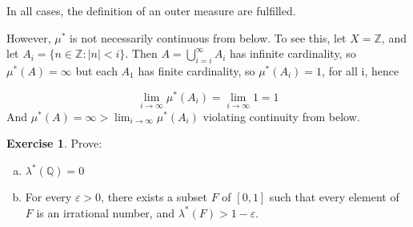 \documentclass[11pt,oneside]{article}
\numberwithin{equation}{section}
\theoremstyle{definition}
\newtheorem{exercise}{Exercise}
\def\QQ{\mathbb{Q}}
\def\ZZ{\mathbb{Z}}
\begin{document}
\begin{solution}
\begin{enumerate}[(a)]
      In all cases, the definition of an outer measure are fulfilled.
  \end{enumerate}

  However, $\mu ^*$ is not necessarily continuous from below.  To see
  this, let $X = \ZZ$, and let $A_i = \{ n \in \ZZ : |n| < i \}$.
  Then $A = \bigcup \limits _ { i=i } ^ \infty A_i$ has infinite
  cardinality, so $\mu ^* ( A) = \infty$ but each $A_1$ has finite
  cardinality, so $\mu ^*(A_i) = 1$, for all i, hence

  $$ \lim _ { i \to \infty } \mu ^* (A_i) = \lim _ { i \to \infty} 1 = 1
  $$
  And $ \mu^* ( A) = \infty > \lim _ { i \to \infty } \mu ^* (A_i)$ violating
  continuity from below.  
  
\end{solution}

\begin{exercise}
  Prove:
  \begin{enumerate}[(a)]
  \item
    $\lambda ^* ( \QQ ) = 0 $
  \item
    For every $ \varepsilon > 0$, there exists a subset $F$ of $[0,1]$ such that every element of $F$ is an irrational number,
    and $ \lambda ^* ( F) > 1 - \varepsilon $.
    
  \end{enumerate}
\end{exercise}
\end{document}
